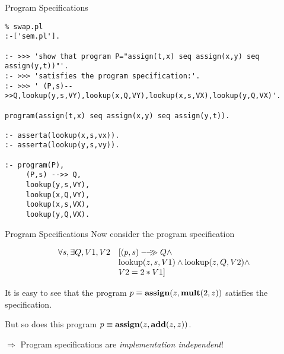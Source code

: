\documentclass{beamer}
\begin{document}
\begin{frame}[fragile]{Program Specifications}

{\tiny
\begin{verbatim}
% swap.pl
:-['sem.pl'].

:- >>> 'show that program P="assign(t,x) seq assign(x,y) seq assign(y,t))"'.
:- >>> 'satisfies the program specification:'.
:- >>> ' (P,s)-->>Q,lookup(y,s,VY),lookup(x,Q,VY),lookup(x,s,VX),lookup(y,Q,VX)'.

program(assign(t,x) seq assign(x,y) seq assign(y,t)).                                              
                                                                                                   
:- asserta(lookup(x,s,vx)).
:- asserta(lookup(y,s,vy)).                                                                        
                                                                                                   
:- program(P),
     (P,s) -->> Q,
     lookup(y,s,VY),
     lookup(x,Q,VY),
     lookup(x,s,VX),                                                                               
     lookup(y,Q,VX).
\end{verbatim}
}
\end{frame}




\begin{frame}[fragile]{Program Specifications}
Now consider the program specification
{\scriptsize
\[
\begin{array}{rl}
\forall s,\exists Q,V1,V2& [{(p,s)}-\!\!-\!\!\!\!\gg{Q} \wedge \\
   		& {\rm lookup}(z,s,V1) \wedge {\rm lookup}(z,Q,V2) \wedge\\
		& V2 =  2 * V1 ]
\end{array}
\]

}
It is easy to see that the program $p \equiv {\bf assign}(z,{\bf mult}(2,z))$ satisfies the specification.

\vspace{.1in}

But so does this program $p \equiv {\bf assign}(z,{\bf add}(z,z))$.

\vspace{.3in}

$\Rightarrow$ Program specifications are {\em implementation independent}!
\end{frame}
\end{document}
